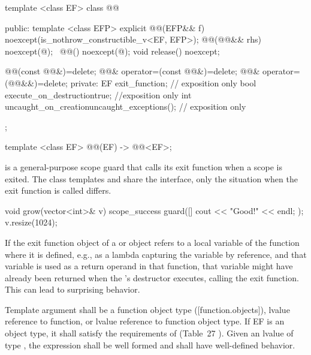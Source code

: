 \documentclass[ebook,11pt,article]{memoir}
\begin{document}
\begin{codeblock}
template <class EF>
class @@ {
public:
  template <class EFP>
  explicit @@(EFP&& f) 
  noexcept(is_nothrow_constructible_v<EF, EFP>);
  @@(@@&& rhs) noexcept(@\seebelow@);
  ~@@() noexcept(@\seebelow@);
  void release() noexcept;

  @@(const @@&)=delete;
  @@& operator=(const @@&)=delete;
  @@& operator=(@@&&)=delete;
private:
  EF exit_function;    // exposition only
  bool execute_on_destruction{true}; //exposition only
  int  uncaught_on_creation{uncaught_exceptions()}; // exposition only
};

template <class EF>
@@(EF) -> @@<EF>;

\end{codeblock}

\pnum
{} is a general-purpose scope guard that calls its exit function when a scope is exited. The class templates  and  share the  interface, only the situation when the exit function is called differs.\\
\begin{example}
\begin{codeblock}
void grow(vector<int>& v){
	scope_success guard([]{ cout << "Good!" << endl; });
	v.resize(1024);
}
\end{codeblock}
\end{example}

\pnum
\begin{note}
If the exit function object of a  or  object refers to a local variable of the function where it is defined, e.g., as a lambda capturing the variable by reference, and that variable is used as a return operand in that function, that variable might have already been returned when the 's destructor executes, calling the exit function. This can lead to surprising behavior. 
\end{note}


\pnum
\requires
Template argument  shall be a function object type ([function.objects]), 
lvalue reference to function, or 
lvalue reference to function object type.
If EF is an object type, it  shall satisfy
the requirements of  (Table~27
). 
Given an lvalue  of type , the expression  shall be well formed and shall have well-defined behavior.
\end{document}
